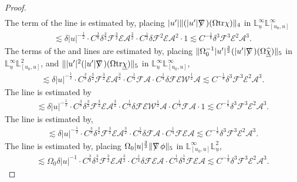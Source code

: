 \documentclass[11pt,reqno]{amsart}
\theoremstyle{definition}
\numberwithin{equation}{section}
\newcommand{\tr}{\mathrm{tr}}
\renewcommand{\L}{\mathbb{L}}
\def\chib{\underline{\chi}}
\def\chibh{\widehat{\underline{\chi}}}
\def\tr{\mathrm{tr}}
\def\ub{\underline{u}}
\def\nablas{\mbox{$\nabla \mkern -13mu /$ }}
\begin{document}
\begin{proof}
\begin{align*}
\end{align*}
The  term of the  line is estimated by, placing $|u'|\|(|u'|\nablas)(\Omega\tr\chi)\|_4$ in $\L_{\ub}^\infty\L^\infty_{[u_0,u]}$
\begin{align*}
\lesssim\delta|u|^{-\frac{1}{2}}\cdot C^{\frac{3}{8}}\delta^{\frac{3}{2}}\mathscr{F}^{\frac{3}{2}}\mathscr{E}\mathcal{A}^{\frac{3}{2}}\cdot  C^{\frac{1}{2}}\delta\mathscr{F}^2\mathscr{E}\mathcal{A}^2\cdot 1\lesssim C^{-\frac{1}{8}}\delta^3\mathscr{F}^3\mathscr{E}^2\mathcal{A}^3.
\end{align*}
The  terms of the  and  lines are estimated by, placing $\|\Omega_0^{-1}|u'|^{\frac{3}{2}}(|u'|\nablas)(\Omega\chibh)\|_5$ in $\L_{\ub}^\infty\L^2_{[u_0,u]}$, and $\||u'|^2(|u'|\nablas)(\Omega\tr\chib)\|_5$ in $\L_{\ub}^\infty\L^\infty_{[u_0,u]}$, 
\begin{align*}
\lesssim\delta|u|^{-\frac{1}{2}}\cdot C^{\frac{3}{8}}\delta^{\frac{3}{2}}\mathscr{F}^{\frac{3}{2}}\mathscr{E}\mathcal{A}^{\frac{3}{2}}\cdot  C^{\frac{1}{4}}\mathscr{F}\mathcal{A}\cdot C^{\frac{1}{4}}\delta\mathscr{F}\mathscr{E}\mathscr{W}^{\frac{1}{2}}\mathcal{A}\lesssim C^{-\frac{1}{8}}\delta^3\mathscr{F}^3\mathscr{E}^2\mathcal{A}^3.
\end{align*}
The  line is estimated by
\begin{align*}
\lesssim\delta|u|^{-\frac{1}{2}}\cdot C^{\frac{3}{8}}\delta^{\frac{3}{2}}\mathscr{F}^{\frac{3}{2}}\mathscr{E}\mathcal{A}^{\frac{3}{2}}\cdot C^{\frac{1}{4}}\delta\mathscr{F}\mathscr{E}\mathscr{W}^{\frac{1}{2}}\mathcal{A}\cdot C^{\frac{1}{4}}\mathscr{F}\mathcal{A}\cdot1\lesssim C^{-\frac{1}{8}}\delta^3\mathscr{F}^3\mathscr{E}^2\mathcal{A}^3.
\end{align*}
The  line is estimated by,
\begin{align*}
\lesssim\delta|u|^{-\frac{1}{2}}\cdot C^{\frac{3}{8}}\delta^{\frac{3}{2}}\mathscr{F}^{\frac{3}{2}}\mathscr{E}\mathcal{A}^{\frac{3}{2}}\cdot  C^{\frac{1}{4}}\delta\mathscr{F}\mathcal{A}\cdot C^{\frac{1}{4}}\mathscr{F}\mathscr{E}\mathcal{A}\lesssim C^{-\frac{1}{8}}\delta^3\mathscr{F}^3\mathscr{E}^2\mathcal{A}^3.
\end{align*}
The  line is estimated by, placing $\Omega_0|u|^{\frac{3}{2}}\|\nablas\phi\|_5$ in $\L^\infty_{[u_0,u]}\L_{\ub}^2$,
\begin{align*}
\lesssim\Omega_0\delta|u|^{-1}\cdot C^{\frac{3}{8}}\delta^{\frac{3}{2}}\mathscr{F}^{\frac{3}{2}}\mathscr{E}\mathcal{A}^{\frac{3}{2}}\cdot  C^{\frac{1}{4}}\delta\mathscr{F}\mathscr{E}\mathcal{A}\cdot C^{\frac{1}{4}}\delta^{\frac{1}{2}}\mathscr{F}\mathscr{E}\mathcal{A}\lesssim C^{-\frac{1}{8}}\delta^3\mathscr{F}^3\mathscr{E}^2\mathcal{A}^3.

\end{align*}
\end{proof}
\end{document}
